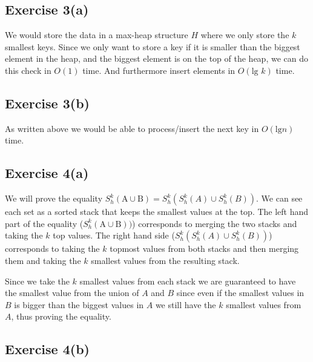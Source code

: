 \subsection{Exercise 3(a)}
\label{sec:ex3a}
We would store the data in a max-heap structure $H$ where we only store the $k$
smallest keys. Since we only want to store a key if it is smaller than the
biggest element in the heap, and the biggest element is on the top of the heap,
we can do this check in $O(1)$ time. And furthermore insert elements in
$O(\text{lg }k)$ time.


\subsection{Exercise 3(b)}
As written above we would be able to process/insert the next key in $O(\text{lg
} n)$ time.

\subsection{Exercise 4(a)}
We will prove the equality $S^{k}_{h}(\text{A} \cup \text{B}) =
S^{k}_{h}(S^{k}_{h}(A) \cup S^{k}_{h}(B))$.
%
We can see each set as a sorted stack that keeps the smallest values at the
top. The left hand part of the equality ($S^{k}_{h}(\text{A} \cup \text{B}))$)
corresponds to merging the two stacks and taking the $k$ top values.
%
The right hand side ($S^{k}_{h}(S^{k}_{h}(A) \cup S^{k}_{h}(B))$) corresponds to
taking the $k$ topmost values from both stacks and then merging them and taking
the $k$ smallest values from the resulting stack.

Since we take the $k$ smallest values from each stack we are guaranteed to have
the smallest value from the union of $A$ and $B$ since even if the smallest
values in $B$ is bigger than the biggest values in $A$ we still have the $k$
smallest values from $A$, thus proving the equality.

\subsection{Exercise 4(b)}

